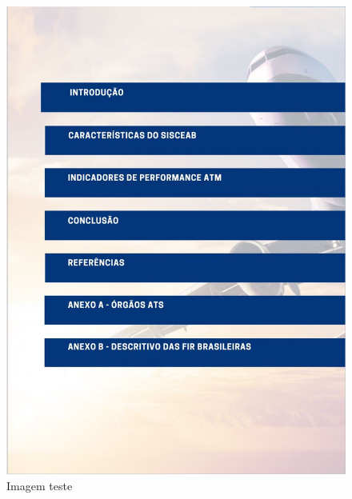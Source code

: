 \documentclass[
]{book}
\begin{document}
\begin{figure}
\centering
\includegraphics{imagens/fig7.jpg}
\caption{Imagem teste}
\end{figure}
\end{document}

